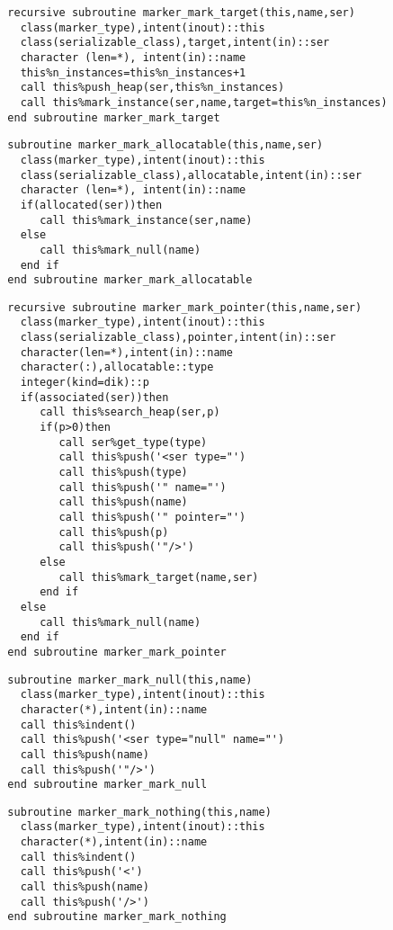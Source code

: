 \begin{Verbatim}
  recursive subroutine marker_mark_target(this,name,ser)
    class(marker_type),intent(inout)::this
    class(serializable_class),target,intent(in)::ser
    character (len=*), intent(in)::name
    this%n_instances=this%n_instances+1
    call this%push_heap(ser,this%n_instances)
    call this%mark_instance(ser,name,target=this%n_instances)
  end subroutine marker_mark_target
\end{Verbatim}

\begin{Verbatim}
  subroutine marker_mark_allocatable(this,name,ser)
    class(marker_type),intent(inout)::this
    class(serializable_class),allocatable,intent(in)::ser
    character (len=*), intent(in)::name
    if(allocated(ser))then
       call this%mark_instance(ser,name)
    else
       call this%mark_null(name)
    end if
  end subroutine marker_mark_allocatable
\end{Verbatim}

\begin{Verbatim}
  recursive subroutine marker_mark_pointer(this,name,ser)
    class(marker_type),intent(inout)::this
    class(serializable_class),pointer,intent(in)::ser
    character(len=*),intent(in)::name
    character(:),allocatable::type
    integer(kind=dik)::p
    if(associated(ser))then
       call this%search_heap(ser,p)
       if(p>0)then
          call ser%get_type(type)
          call this%push('<ser type="')
          call this%push(type)
          call this%push('" name="')
          call this%push(name)
          call this%push('" pointer="')
          call this%push(p)
          call this%push('"/>')
       else
          call this%mark_target(name,ser)
       end if
    else
       call this%mark_null(name)
    end if
  end subroutine marker_mark_pointer
\end{Verbatim}

\begin{Verbatim}
  subroutine marker_mark_null(this,name)
    class(marker_type),intent(inout)::this
    character(*),intent(in)::name
    call this%indent()
    call this%push('<ser type="null" name="')
    call this%push(name)
    call this%push('"/>')
  end subroutine marker_mark_null
\end{Verbatim}

\begin{Verbatim}
  subroutine marker_mark_nothing(this,name)
    class(marker_type),intent(inout)::this
    character(*),intent(in)::name
    call this%indent()
    call this%push('<')
    call this%push(name)
    call this%push('/>')
  end subroutine marker_mark_nothing
\end{Verbatim}

